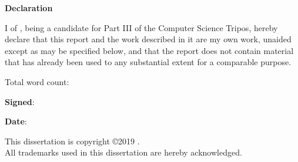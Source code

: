 \newpage
{\Huge \bf Declaration}

\vspace{24pt} 

I \authorname of \authorcollege, being a candidate for Part III of the Computer Science Tripos, hereby declare that this report and the
work described in it are my own work, unaided except as may be
specified below, and that the report does not contain material that
has already been used to any substantial extent for a comparable
purpose.

\vspace{24pt}
Total word count: \wordcount

\vspace{60pt}
\textbf{Signed}: 

\vspace{12pt}
\textbf{Date}:


\vfill

This dissertation is copyright \copyright 2019 \authorname. 
\\
All trademarks used in this dissertation are hereby acknowledged.



\newpage
\vspace*{\fill}
